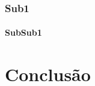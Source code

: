 
\lipsum[1]

\lipsum[2-3]

\subsection{Sub1}

\lipsum[1]

\subsubsection{SubSub1}

\lipsum[1-10]


\chapter{Conclusão}

\lipsum[31-33]

\postextual %


%
%


